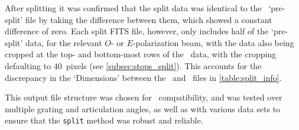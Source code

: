 

After splitting it was confirmed that the split data was identical to the \polsalt\ `pre-split' file by taking the difference between them, which showed a constant difference of zero.
Each split \gls{FITS} file, however, only includes half of the `pre-split' data, for the relevant $O$- or $E$-polarization beam, with the data also being cropped at the top- and bottom-most rows of the \polsalt\ data, with the cropping defaulting to $40$~pixels (see \autoref{subsec:stops_split}). This accounts for the discrepancy in the `Dimensions' between the \polsalt\ and \stops\ files in \autoref{table:split_info}.

This output file structure was chosen for \iraf\ compatibility, and was tested over multiple grating and articulation angles, as well as with various data sets to ensure that the \texttt{split} method was robust and reliable.

